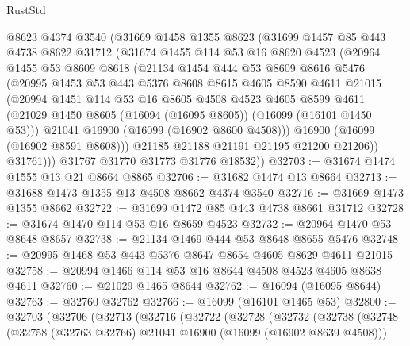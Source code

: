 \begin{lexlean}{RustStd}
\begin{coremodule}
        @8623
        @4374
        @3540
        (@31669
          @1458
          @1355
          @8623
          (@31699
            @1457
            @85
            @443
            @4738
            @8622
            @31712
            (@31674
              @1455
              @114
              @53
              @16
              @8620
              @4523
              (@20964
                @1455
                @53
                @8609
                @8618
                (@21134
                  @1454
                  @444
                  @53
                  @8609
                  @8616
                  @5476
                  (@20995
                    @1453
                    @53
                    @443
                    @5376
                    @8608
                    @8615
                    @4605
                    @8590
                    @4611
                    @21015
                    (@20994
                      @1451
                      @114
                      @53
                      @16
                      @8605
                      @4508
                      @4523
                      @4605
                      @8599
                      @4611
                      (@21029 @1450 @8605 (@16094 (@16095 @8605)) (@16099 (@16101 @1450 @53)))
                      @21041
                      @16900
                      (@16099 (@16902 @8600 @4508)))
                    @16900
                    (@16099 (@16902 @8591 @8608)))
                  @21185
                  @21188
                  @21191
                  @21195
                  @21200
                  @21206))
              @31761)))
        @31767
        @31770
        @31773
        @31776
        @18532))
@32703 := @31674 @1474 @1555 @13 @21 @8664 @8865
@32706 := @31682 @1474 @13 @8664
@32713 := @31688 @1473 @1355 @13 @4508 @8662 @4374 @3540
@32716 := @31669 @1473 @1355 @8662
@32722 := @31699 @1472 @85 @443 @4738 @8661 @31712
@32728 := @31674 @1470 @114 @53 @16 @8659 @4523
@32732 := @20964 @1470 @53 @8648 @8657
@32738 := @21134 @1469 @444 @53 @8648 @8655 @5476
@32748 := @20995 @1468 @53 @443 @5376 @8647 @8654 @4605 @8629 @4611 @21015
@32758 := @20994 @1466 @114 @53 @16 @8644 @4508 @4523 @4605 @8638 @4611
@32760 := @21029 @1465 @8644
@32762 := @16094 (@16095 @8644)
@32763 := @32760 @32762
@32766 := @16099 (@16101 @1465 @53)
@32800 := @32703
    (@32706
      (@32713
        (@32716
          (@32722
            (@32728
              (@32732
                (@32738
                  (@32748
                    (@32758 (@32763 @32766) @21041 @16900 (@16099 (@16902 @8639 @4508)))

\end{coremodule}
\end{lexlean}
